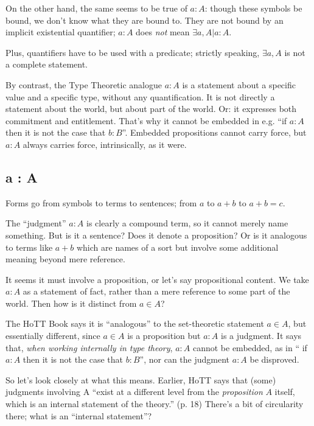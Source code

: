 On the other hand, the same seems to be true of \(a : A\): though
these symbols be bound, we don't know what they are bound to.  They
are not bound by an implicit existential quantifier; \(a : A\) does
\textit{not} mean \(\exists a, A | a : A\).

\begin{remark}
  Plus, quantifiers have to be used with a predicate; strictly
  speaking, \(\exists a, A\) is not a complete statement.
\end{remark}

By contrast, the Type Theoretic analogue \(a : A\) is a statement
about a specific value and a specific type, without any
quantification.  It is not directly a statement about the world, but
about part of the world.  Or: it expresses both commitment and
entitlement.  That's why it cannot be embedded in e.g. ``if \(a : A\)
then it is not the case that \(b : B\)''.  Embedded propositions
cannot carry force, but \(a : A\) always carries force, intrinsically,
as it were.

\subsection{a : A}
\label{subs:aA}

Forms go from symbols to terms to sentences; from \(a\) to \(a+b\) to
\(a+b=c\).

The ``judgment'' \(a : A\) is clearly a compound term, so it cannot
merely name something.  But is it a sentence?  Does it denote a
proposition?  Or is it analogous to terms like \(a+b\) which are names
of a sort but involve some additional meaning beyond mere reference.

It seems it must involve a proposition, or let's say propositional
content.  We take \(a : A\) as a statement of fact, rather than a mere
reference to some part of the world.  Then how is it distinct from
\(a\in A\)?

The HoTT Book says it is ``analogous'' to the set-theoretic statement
\(a\in A\), but essentially different, since \(a\in A\) is a
proposition but \(a : A\) is a judgment.  It says that, \textit{when
  working internally in type theory}, \(a : A\) cannot be embedded, as
in `` if \(a : A\) then it is not the case that \(b : B\)'', nor can
the judgment \(a : A\) be disproved.

So let's look closely at what this means.  Earlier, HoTT says that
(some) judgments involving A ``exist at a different level from the
\textit{proposition} \(A\) itself, which is an internal statement of
the theory.''  (p. 18) There's a bit of circularity there; what is an
``internal statement''?

